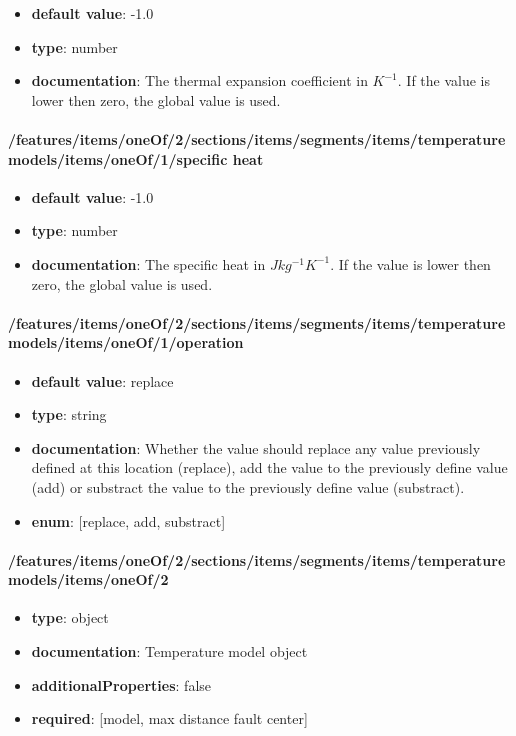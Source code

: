 \begin{itemize}\item {\bf default value}: -1.0
\item {\bf type}: number
\item {\bf documentation}: The thermal expansion coefficient in $K^{-1}$. If the value is lower then zero, the global value is used.
\end{itemize}\paragraph{/features/items/oneOf/2/sections/items/segments/items/temperature models/items/oneOf/1/specific heat}
\begin{itemize}\item {\bf default value}: -1.0
\item {\bf type}: number
\item {\bf documentation}: The specific heat in $J kg^{-1} K^{-1}$. If the value is lower then zero, the global value is used.
\end{itemize}\paragraph{/features/items/oneOf/2/sections/items/segments/items/temperature models/items/oneOf/1/operation}
\begin{itemize}\item {\bf default value}: replace
\item {\bf type}: string
\item {\bf documentation}: Whether the value should replace any value previously defined at this location (replace), add the value to the previously define value (add) or substract the value to the previously define value (substract).
\item {\bf enum}: [replace, add, substract]\end{itemize}\paragraph{/features/items/oneOf/2/sections/items/segments/items/temperature models/items/oneOf/2}
\begin{itemize}\item {\bf type}: object
\item {\bf documentation}: Temperature model object
\item {\bf additionalProperties}: false
\item {\bf required}: [model, max distance fault center]\end{itemize}
